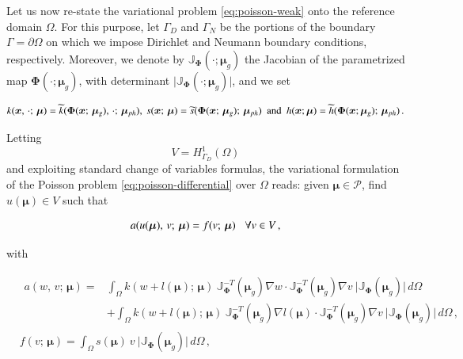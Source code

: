 \documentclass[longtitle]{elsarticle}
\numberwithin{equation}{section}
\theoremstyle{theorem}
\theoremstyle{definition}
\theoremstyle{remark}
\theoremstyle{proposition}
\numberwithin{figure}{section}
\newcommand{\wt}[1]{\widetilde{#1}}
\newcommand{\bg}[1]{\boldsymbol{#1}}
\begin{document}
		Let us now re-state the variational problem \eqref{eq:poisson-weak} onto the reference domain $\Omega$. For this purpose, let $\Gamma_D$ and $\Gamma_N$ be the portions of the boundary $\Gamma = \partial \Omega$ on which we impose Dirichlet and Neumann boundary conditions, respectively. Moreover, we denote by $\mathbb{J}_{\bg{\Phi}}(\cdot; \bg{\mu}_g)$ the Jacobian of the parametrized map $\bg{\Phi}(\cdot; \bg{\mu}_g)$, with determinant $\lvert \mathbb{J}_{\bg{\Phi}}(\cdot; \bg{\mu}_g) \rvert$, and we set 
	\vspace*{-0.2cm}	
	\begin{linenomath}\begin{equation*}
		k(\bg{x}, \, \cdot; \, \bg{\mu}) = \wt{k}(\bg{\Phi}(\bg{x}; \, \bg{\mu}_g), \, \cdot; \, \bg{\mu}_{ph}), ~ s(\bg{x}; \, \bg{\mu}) = \wt{s}(\bg{\Phi}(\bg{x}; \, \bg{\mu}_g); \, \bg{\mu}_{ph}) ~~ \text{and} ~~ h(\bg{x}; \bg{\mu}) = \wt{h}(\bg{\Phi}(\bg{x}; \bg{\mu}_g); \, \bg{\mu}_{ph}) \, . 
		\vspace*{-0.2cm}
	\end{equation*}\end{linenomath}
	Letting \[ V = H^1_{\Gamma_D}(\Omega) \] and exploiting standard change of variables formulas, the variational formulation of the Poisson problem \eqref{eq:poisson-differential} over $\Omega$ reads: given $\bg{\mu} \in \mathcal{P}$, find $u(\bg{\mu}) \in V$ such that
		\begin{linenomath}\begin{equation*}
			a(u(\bg{\mu}), \, v; \, \bg{\mu}) = f(v; \, \bg{\mu}) \hspace*{0.3cm} \forall v \in V \, ,
		\end{equation*}\end{linenomath}
		with
		\vspace*{0.1cm}
		\begin{linenomath}\begin{equation*}
			\begin{aligned}
				&
				\begin{aligned}
				a(w, \, v; \, \bg{\mu}) = & \int_{\Omega} k(w + l(\bg{\mu}); \, \bg{\mu}) ~ \mathbb{J}^{-T}_{\bg{\Phi}}(\bg{\mu}_g) \nabla w \cdot \mathbb{J}^{-T}_{\bg{\Phi}}(\bg{\mu}_g) \nabla v ~ \lvert \mathbb{J}_{\bg{\Phi}}(\bg{\mu}_g) \rvert \, d \Omega \\[0.1cm]
				& + \int_{\Omega} k(w + l(\bg{\mu}); \, \bg{\mu}) ~ \mathbb{J}^{-T}_{\bg{\Phi}}(\bg{\mu}_g) \nabla l(\bg{\mu}) \cdot \mathbb{J}^{-T}_{\bg{\Phi}}(\bg{\mu}_g) \nabla v ~ \lvert \mathbb{J}_{\bg{\Phi}}(\bg{\mu}_g) \rvert \, d \Omega \, ,
				\end{aligned} \\[0.2cm]
				& f(v; \, \bg{\mu}) = \int_{\Omega} s(\bg{\mu}) ~ v ~ \lvert \mathbb{J}_{\bg{\Phi}}(\bg{\mu}_g) \rvert \, d \Omega \, ,  
			\end{aligned}
		\end{equation*}\end{linenomath}
\end{document}
